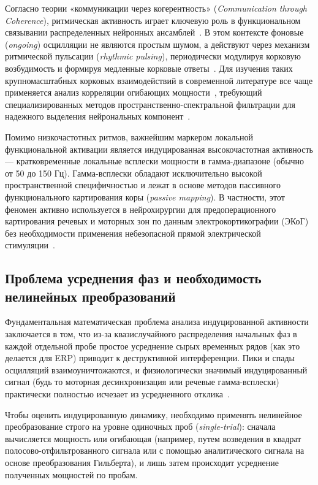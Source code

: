 Согласно теории «коммуникации через когерентность» (\textit{Communication through Coherence}), ритмическая активность играет ключевую роль в функциональном связывании распределенных нейронных ансамблей~\cite{fries2005mechanism}. В этом контексте фоновые (\textit{ongoing}) осцилляции не являются простым шумом, а действуют через механизм ритмической пульсации (\textit{rhythmic pulsing}), периодически модулируя корковую возбудимость и формируя медленные корковые ответы~\cite{mazaheri2010rhythmic, engel2001dynamic}. Для изучения таких крупномасштабных корковых взаимодействий в современной литературе все чаще применяется анализ корреляции огибающих мощности~\cite{brookes2011investigating}, требующий специализированных методов пространственно-спектральной фильтрации для надежного выделения нейрональных компонент~\cite{nikulin2011novel}.

Помимо низкочастотных ритмов, важнейшим маркером локальной функциональной активации является индуцированная высокочастотная активность --- кратковременные локальные всплески мощности в гамма-диапазоне (обычно от 50 до 150 Гц). Гамма-всплески обладают исключительно высокой пространственной специфичностью и лежат в основе методов пассивного функционального картирования коры (\textit{passive mapping}). В частности, этот феномен активно используется в нейрохирургии для предоперационного картирования речевых и моторных зон по данным электрокортикографии (ЭКоГ) без необходимости применения небезопасной прямой электрической стимуляции~\cite{voskoboynikov2025toward}.

\subsection{Проблема усреднения фаз и необходимость нелинейных преобразований}
\label{sec:phase_averaging_problem}

Фундаментальная математическая проблема анализа индуцированной активности заключается в том, что из-за квазислучайного распределения начальных фаз в каждой отдельной пробе простое усреднение сырых временных рядов (как это делается для ERP) приводит к деструктивной интерференции. Пики и спады осцилляций взаимоуничтожаются, и физиологически значимый индуцированный сигнал (будь то моторная десинхронизация или речевые гамма-всплески) практически полностью исчезает из усредненного отклика~\cite{pfurtscheller1999event, tallon1999oscillatory}.

Чтобы оценить индуцированную динамику, необходимо применять нелинейное преобразование строго на уровне одиночных проб (\textit{single-trial}): сначала вычисляется мощность или огибающая (например, путем возведения в квадрат полосово-отфильтрованного сигнала или с помощью аналитического сигнала на основе преобразования Гильберта), и лишь затем происходит усреднение полученных мощностей по пробам.

